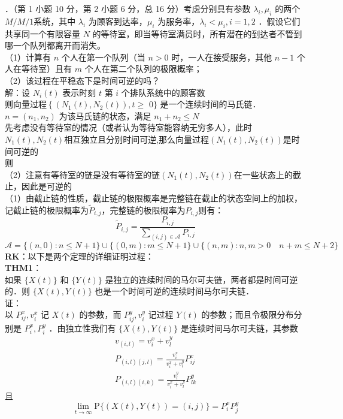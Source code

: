 \documentclass[UTF8,openany]{book}
\begin{document}
．（第 1 小题 10 分，第 2 小题 6 分，总 16 分）考虑分别具有参数 $\lambda_i, \mu_i$ 的两个 $M / M / 1$系统，其中 $\lambda_i$ 为顾客到达率，$\mu_i$ 为服务率，$\lambda_i<\mu_i, i=1,2$ ．假设它们共享同一个有限容量 $N$ 的等待室，即当等待室满员时，所有潜在的到达者不管到哪一个队列都离开而消失。\\
（1）计算有 $n$ 个人在第一个队列（当 $n>0$ 时，一人在接受服务，其他 $n-1$ 个人在等待室）且有 $m$ 个人在第二个队列的极限概率；\\
（2）该过程在平稳态下是时间可逆的吗？\\
解：设 $N_i(t)$ 表示时刻 $t$ 第 $i$ 个排队系统中的顾客数\\
则向量过程$\left\{\left(N_1(t), N_2(t)\right), t \geq\right.$ $0\}$ 是一个连续时间的马氏链．$n=\left(n_1, n_2\right)$ 为该马氏链的状态，满足 $n_1+n_2 \leq N$ \\
先考虑没有等待室的情况（或者认为等待室能容纳无穷多人），此时$N_1(t),N_2(t)$相互独立且分别时间可逆,那么向量过程$\left(N_1(t), N_2(t)\right)$是时间可逆的\\
则\\
（2）注意有等待室的链是没有等待室的链$\left(N_1(t), N_2(t)\right)$在一些状态上的截止，因此是可逆的\\
（1）由截止链的性质，截止链的极限概率是完整链在截止的状态空间上的加权，记截止链的极限概率为$\tilde{P}_{i,j}$，完整链的极限概率为$P_{i,j}$则有：\\
\[
\tilde{P}_{i,j}=\frac{P_{i,j}}{\sum\limits_{(i,j) \in \mathcal{A}}^{} P_{i,j}} 
\]
\[
\mathcal{A}=\{(n,0):n\le N+1 \} \cup \{ (0,m):m \le N+1\} \cup \{ (n,m):n,m>0\quad n+m \le N+2\}
\]
\textbf{RK}：以下是两个定理的详细证明过程：\\
\textbf{THM1}：\\
如果 $\{X(t)\}$ 和 $\{Y(t)\}$ 是独立的连续时间的马尔可夫链，两者都是时间可逆的．则 $\{X(t), Y(t)\}$ 也是一个时间可逆的连续时间马尔可夫链．\\
证：\\
以 $P_{i j}^x, v_i^x$ 记 $X(t)$ 的参数，而 $P_{i j}^y, v_i^y$ 记过程 $Y(t)$ 的参数；而且令极限分布分别是 $P_i^x, P_i^y$ ．由独立性我们有 $\{X(t), Y(t)\}$ 是连续时间马尔可夫链，其参数
$$
\begin{gathered}
	v_{(i, l)}=v_i^x+v_l^y \\
	P_{(i, l)(j, l)}=\frac{v_i^x}{v_i^x+v_l^y} P_{i j}^x\\
	P_{(i, l)(i, k)}=\frac{v_l^y}{v_i^x+v_l^y} P_{l k}^y
\end{gathered}
$$
且
$$
\lim _{t \rightarrow \infty} \mathrm{P}\{(X(t), Y(t))=(i, j)\}=P_i^x P_j^y
$$
\end{document}
